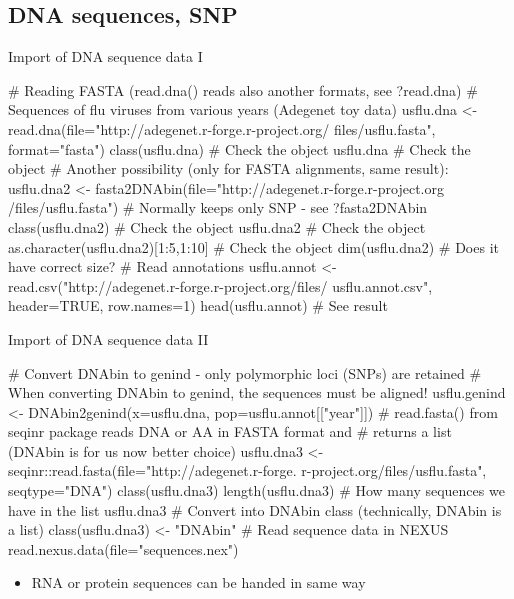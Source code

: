\documentclass[compress, ucs, xelatex, 11pt, xcolor=svgnames,
  hyperref={
    bookmarks=true,
    unicode=true,
    colorlinks=true,
    pdftitle={Molecular data in R},
    plainpages=false,
    pdfauthor={Vojtech Zeisek},
    pdfsubject={Course about phylogeny and evolution in R},
    pdfcreator={XeLaTeX},
    pdfkeywords={R, evolution, phylogeny, molecular data},
    linkcolor=Tomato,
    anchorcolor=SaddleBrown,
    citecolor=Goldenrod,
    filecolor=DarkMagenta,
    menucolor=Sienna,
    urlcolor=DarkTurquoise,
    pdftex},
  url={hyphens, lowtilde} %
  ]{beamer}
\begin{document}
\subsection{DNA sequences, SNP}

\begin{frame}[fragile]{Import of DNA sequence data I}
  \begin{spluscode}
    # Reading FASTA (read.dna() reads also another formats, see ?read.dna)
    # Sequences of flu viruses from various years (Adegenet toy data)
    usflu.dna <- read.dna(file="http://adegenet.r-forge.r-project.org/
      files/usflu.fasta", format="fasta")
    class(usflu.dna) # Check the object
    usflu.dna # Check the object
    # Another possibility (only for FASTA alignments, same result):
    usflu.dna2 <- fasta2DNAbin(file="http://adegenet.r-forge.r-project.org
      /files/usflu.fasta") # Normally keeps only SNP - see ?fasta2DNAbin
    class(usflu.dna2) # Check the object
    usflu.dna2 # Check the object
    as.character(usflu.dna2)[1:5,1:10] # Check the object
    dim(usflu.dna2) # Does it have correct size?
    # Read annotations
    usflu.annot <- read.csv("http://adegenet.r-forge.r-project.org/files/
      usflu.annot.csv", header=TRUE, row.names=1)
    head(usflu.annot) # See result
  \end{spluscode}
\end{frame}

\begin{frame}[fragile]{Import of DNA sequence data II}
  \begin{spluscode}
    # Convert DNAbin to genind - only polymorphic loci (SNPs) are retained
    # When converting DNAbin to genind, the sequences must be aligned!
    usflu.genind <- DNAbin2genind(x=usflu.dna, pop=usflu.annot[["year"]])
    # read.fasta() from seqinr package reads DNA or AA in FASTA format and
    # returns a list (DNAbin is for us now better choice)
    usflu.dna3 <- seqinr::read.fasta(file="http://adegenet.r-forge.
      r-project.org/files/usflu.fasta", seqtype="DNA")
    class(usflu.dna3)
    length(usflu.dna3) # How many sequences we have in the list
    usflu.dna3
    # Convert into DNAbin class (technically, DNAbin is a list)
    class(usflu.dna3) <- "DNAbin"
    # Read sequence data in NEXUS
    read.nexus.data(file="sequences.nex")
  \end{spluscode}
  \begin{itemize}
    \item RNA or protein sequences can be handed in same way
  \end{itemize}
\end{frame}
\end{document}
